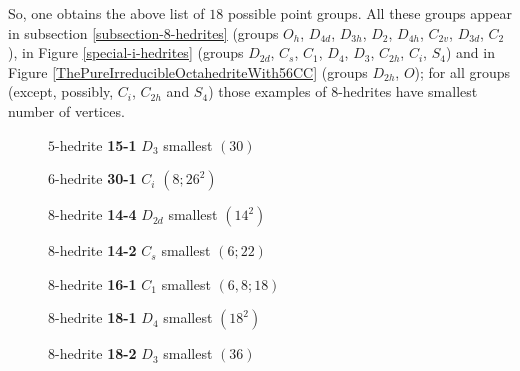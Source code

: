 \documentclass[12pt]{article}
\begin{document}
So, one obtains the above list of $18$ possible point groups. All these groups appear in subsection \ref{subsection-8-hedrites} (groups 
$O_h$, $D_{4d}$, $D_{3h}$, $D_{2}$, $D_{4h}$, $C_{2v}$, $D_{3d}$, $C_2$),
in Figure \ref{special-i-hedrites} (groups $D_{2d}$, $C_s$, $C_1$, $D_4$, $D_{3}$, $C_{2h}$, $C_{i}$, $S_4$) 
and in Figure \ref{ThePureIrreducibleOctahedriteWith56CC} (groups $D_{2h}$, $O$); for all groups (except, possibly, $C_i$, $C_{2h}$ and $S_4$) those examples of $8$-hedrites have smallest number of vertices.


\begin{figure}
{\small
\begin{minipage}[t]{4cm}
\centering
\epsfxsize=4cm
\par
{$5$-hedrite {\bf 15-1} $D_3$ smallest $(30)$}
\end{minipage}
\begin{minipage}[t]{4cm}
\centering
\epsfxsize=4cm
\par
{$6$-hedrite {\bf 30-1} $C_i$ $(8;26^2)$}
\end{minipage}
\begin{minipage}[t]{4cm}
\centering
\epsfxsize=4cm
\par
{$8$-hedrite {\bf 14-4} $D_{2d}$ smallest $(14^2)$}
\end{minipage}
\begin{minipage}[t]{4cm}
\centering
\epsfxsize=4cm
\par
{$8$-hedrite {\bf 14-2} $C_s$ smallest $(6;22)$}
\end{minipage}
\begin{minipage}[t]{4cm}
\centering
\epsfxsize=4cm
\par
{$8$-hedrite {\bf 16-1} $C_1$ smallest $(6, 8; 18)$}
\end{minipage}
\begin{minipage}[t]{4cm}
\centering
\epsfxsize=4cm
\par
{$8$-hedrite {\bf 18-1} $D_4$ smallest $(18^2)$}
\end{minipage}
\begin{minipage}[t]{4cm}
\centering
\epsfxsize=4cm
\par
{$8$-hedrite {\bf 18-2} $D_3$ smallest $(36)$}
\end{minipage}
\begin{minipage}[t]{4cm}
\centering

\end{minipage}}
\end{figure}
\end{document}
